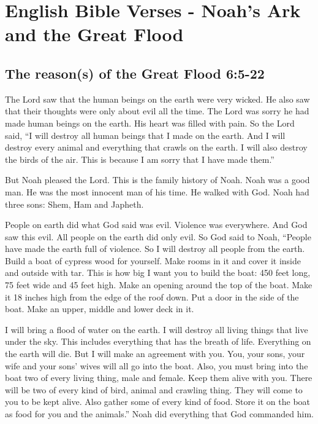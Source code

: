 \newpage
\section{English Bible Verses - Noah's Ark and the Great Flood}


\subsection{The reason(s) of the Great Flood 6:5-22}

The Lord saw that the human beings on the earth were very wicked. He also saw that their thoughts were only about evil all the time. The Lord was sorry he had made human beings on the earth. His heart was filled with pain. So the Lord said, “I will destroy all human beings that I made on the earth. And I will destroy every animal and everything that crawls on the earth. I will also destroy the birds of the air. This is because I am sorry that I have made them.” 

But Noah pleased the Lord. This is the family history of Noah. Noah was a good man. He was the most innocent man of his time. He walked with God. Noah had three sons: Shem, Ham and Japheth.

People on earth did what God said was evil. Violence was everywhere. And God saw this evil. All people on the earth did only evil. So God said to Noah, “People have made the earth full of violence. So I will destroy all people from the earth. Build a boat of cypress wood for yourself. Make rooms in it and cover it inside and outside with tar. This is how big I want you to build the boat: 450 feet long, 75 feet wide and 45 feet high. Make an opening around the top of the boat. Make it 18 inches high from the edge of the roof down. Put a door in the side of the boat. Make an upper, middle and lower deck in it. 

I will bring a flood of water on the earth. I will destroy all living things that live under the sky. This includes everything that has the breath of life. Everything on the earth will die. But I will make an agreement with you. You, your sons, your wife and your sons’ wives will all go into the boat. Also, you must bring into the boat two of every living thing, male and female. Keep them alive with you. There will be two of every kind of bird, animal and crawling thing. They will come to you to be kept alive. Also gather some of every kind of food. Store it on the boat as food for you and the animals.” Noah did everything that God commanded him.


